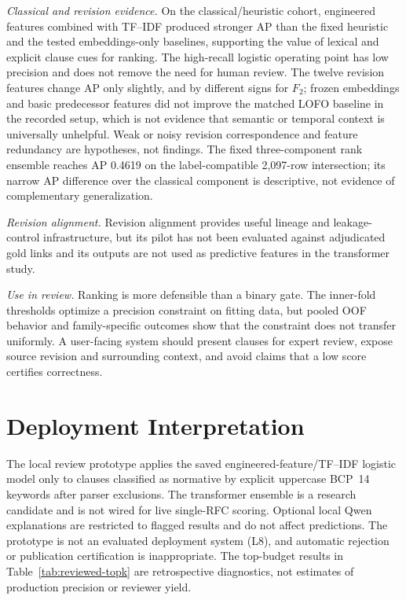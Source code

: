 \documentclass[12pt,a4paper,oneside]{report}
\begin{document}
\emph{Classical and revision evidence.} On the classical/heuristic cohort, engineered features combined with TF--IDF produced stronger AP than the fixed heuristic and the tested embeddings-only baselines, supporting the value of lexical and explicit clause cues for ranking. The high-recall logistic operating point has low precision and does not remove the need for human review. The twelve revision features change AP only slightly, and by different signs for $F_2$; frozen embeddings and basic predecessor features did not improve the matched LOFO baseline in the recorded setup, which is not evidence that semantic or temporal context is universally unhelpful. Weak or noisy revision correspondence and feature redundancy are hypotheses, not findings. The fixed three-component rank ensemble reaches AP 0.4619 on the label-compatible 2,097-row intersection; its narrow AP difference over the classical component is descriptive, not evidence of complementary generalization.

\emph{Revision alignment.} Revision alignment provides useful lineage and leakage-control infrastructure, but its pilot has not been evaluated against adjudicated gold links and its outputs are not used as predictive features in the transformer study.

\emph{Use in review.} Ranking is more defensible than a binary gate. The inner-fold thresholds optimize a precision constraint on fitting data, but pooled OOF behavior and family-specific outcomes show that the constraint does not transfer uniformly. A user-facing system should present clauses for expert review, expose source revision and surrounding context, and avoid claims that a low score certifies correctness.

\section{Deployment Interpretation}

The local review prototype applies the saved engineered-feature/TF--IDF logistic model only to clauses classified as normative by explicit uppercase BCP~14 keywords after parser exclusions. The transformer ensemble is a research candidate and is not wired for live single-RFC scoring. Optional local Qwen explanations are restricted to flagged results and do not affect predictions. The prototype is not an evaluated deployment system (L8), and automatic rejection or publication certification is inappropriate. The top-budget results in Table~\ref{tab:reviewed-topk} are retrospective diagnostics, not estimates of production precision or reviewer yield.
\end{document}
